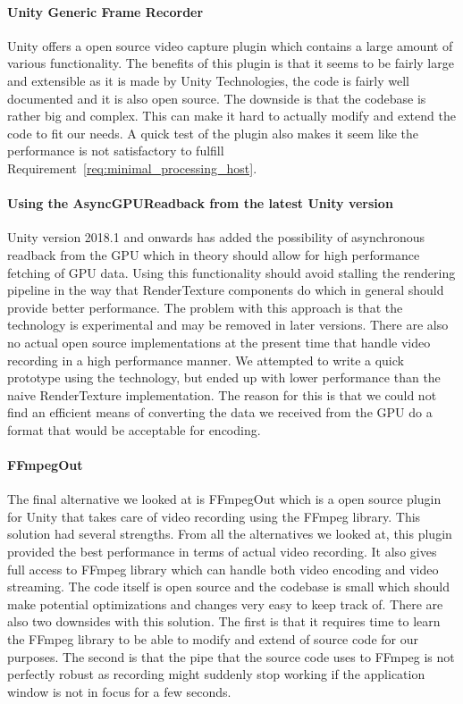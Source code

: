 \paragraph{Unity Generic Frame Recorder}
Unity offers a open source video capture plugin\cite{unity_genericFrameRecprder} which contains a large amount of various functionality. The benefits of this plugin is that it seems to be fairly large and extensible as it is made by Unity Technologies, the code is fairly well documented and it is also open source. The downside is that the codebase is rather big and complex. This can make it hard to actually modify and extend the code to fit our needs. A quick test of the plugin also makes it seem like the performance is not satisfactory to fulfill Requirement~\ref{req:minimal_processing_host}.

\paragraph{Using the AsyncGPUReadback from the latest Unity version}
Unity version 2018.1 and onwards has added the possibility of asynchronous readback from the GPU\cite{unity_asyncReadback} which in theory should allow for high performance fetching of GPU data. Using this functionality should avoid stalling the rendering pipeline in the way that RenderTexture components do which in general should provide better performance. The problem with this approach is that the technology is experimental and may be removed in later versions. There are also no actual open source implementations at the present time that handle video recording in a high performance manner. We attempted to write a quick prototype using the technology, but ended up with lower performance than the naive RenderTexture implementation. The reason for this is that we could not find an efficient means of converting the data we received from the GPU do a format that would be acceptable for encoding. 

\paragraph{FFmpegOut}
The final alternative we looked at is FFmpegOut\cite{ffmpegOut} which is a open source plugin for Unity that takes care of video recording using the FFmpeg\cite{ffmpeg} library. This solution had several strengths. From all the alternatives we looked at, this plugin provided the best performance in terms of actual video recording. It also gives full access to FFmpeg library which can handle both video encoding and video streaming. The code itself is open source and the codebase is small which should make potential optimizations and changes very easy to keep track of. There are also two downsides with this solution. The first is that it requires time to learn the FFmpeg library to be able to modify and extend of source code for our purposes. The second is that the pipe that the source code uses to FFmpeg is not perfectly robust as recording might suddenly stop working if the application window is not in focus for a few seconds.  

